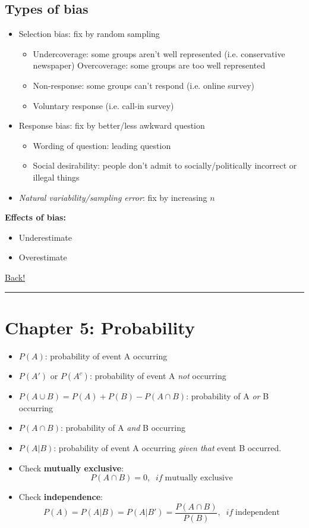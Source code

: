 \documentclass[main]{subfiles}
\begin{document}
\subsection{Types of bias}
\begin{itemize}
    \item Selection bias: fix by random sampling
        \begin{itemize}
            \item Undercoverage: some groups aren't well represented (i.e. conservative newspaper)
                \subitem Overcoverage: some groups are too well represented
            \item Non-response: some groups can't respond (i.e. online survey)
            \item Voluntary response (i.e. call-in survey)
        \end{itemize}
    \item Response bias: fix by better/less awkward question
        \begin{itemize}
            \item Wording of question: leading question
            \item Social desirability: people don't admit to socially/politically incorrect or illegal things
        \end{itemize}
    \item \textit{Natural variability/sampling error}: fix by increasing $n$
\end{itemize}

\noindent\textbf{Effects of bias:}
\begin{itemize}
    \item Underestimate
    \item Overestimate
\end{itemize}

\noindent\hyperlink{toc}{Back!}
\newline\hrule

\section{Chapter 5: Probability}
\begin{itemize}
    \item $P(A)$: probability of event A occurring
    \item $P(A')$ or $P(A^c)$: probability of event A \textit{not} occurring
    \item $P(A \cup B) = P(A) + P(B) - P(A \cap B)$: probability of A \textit{or} B occurring
    \item $P(A \cap B)$: probability of A \textit{and} B occurring
    \item $P(A | B)$: probability of event A occurring \textit{given that} event B occurred.
    \item Check \textbf{mutually exclusive}:
        \[P(A \cap B) = 0, \;\;if\; \textrm{mutually exclusive}\]
    \item Check \textbf{independence}:
        \[P(A) = P(A|B) = P(A|B') = \frac{P(A \cap B)}{P(B)}, \;\;if\; \textrm{independent}\]
\end{itemize}
\end{document}
